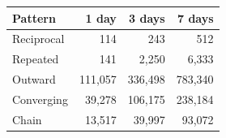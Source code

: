 \begin{tabular}{lrrr}
\toprule
Pattern & 1 day & 3 days & 7 days \\
\midrule
Reciprocal & 114 & 243 & 512 \\
Repeated & 141 & 2{,}250 & 6{,}333 \\
Outward & 111{,}057 & 336{,}498 & 783{,}340 \\
Converging & 39{,}278 & 106{,}175 & 238{,}184 \\
Chain & 13{,}517 & 39{,}997 & 93{,}072 \\
\bottomrule
\end{tabular}
